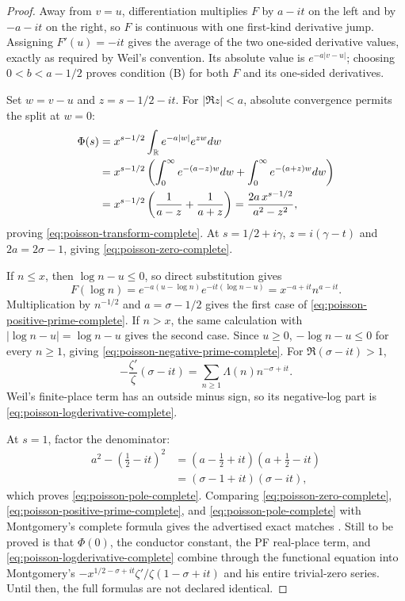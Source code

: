\begin{proof}
Away from $v=u$, differentiation multiplies $F$ by $a-it$ on the left and by
$-a-it$ on the right, so $F$ is continuous with one first-kind derivative
jump.  Assigning $F'(u)=-it$ gives the average of the two one-sided derivative
values, exactly as required by Weil's convention.  Its absolute value is
$e^{-a|v-u|}$; choosing
$0<b<a-1/2$ proves condition (B) for both $F$ and its one-sided derivatives.

Set $w=v-u$ and $z=s-1/2-it$.  For $|\Re z|<a$, absolute convergence permits
the split at $w=0$:
\begin{align*}
 \Phi(s)
 &=x^{s-1/2}\int_\mathbb R e^{-a|w|}e^{zw}dw\\
 &=x^{s-1/2}
 \left(\int_0^\infty e^{-(a-z)w}dw
       +\int_0^\infty e^{-(a+z)w}dw\right)\\
 &=x^{s-1/2}\left(\frac1{a-z}+\frac1{a+z}\right)
 =\frac{2a\,x^{s-1/2}}{a^2-z^2},
\end{align*}
proving \eqref{eq:poisson-transform-complete}.  At
$s=1/2+i\gamma$, $z=i(\gamma-t)$ and $2a=2\sigma-1$, giving
\eqref{eq:poisson-zero-complete}.

If $n\leq x$, then $\log n-u\leq0$, so direct substitution gives
\[
 F(\log n)=e^{-a(u-\log n)}e^{-it(\log n-u)}
 =x^{-a+it}n^{a-it}.
\]
Multiplication by $n^{-1/2}$ and $a=\sigma-1/2$ gives the first case of
\eqref{eq:poisson-positive-prime-complete}.  If $n>x$, the same calculation
with $|\log n-u|=\log n-u$ gives the second case.  Since $u\geq0$,
$-\log n-u\leq0$ for every $n\geq1$, giving
\eqref{eq:poisson-negative-prime-complete}.  For $\Re(\sigma-it)>1$,
\[
 -\frac{\zeta'}{\zeta}(\sigma-it)
 =\sum_{n\geq1}\Lambda(n)n^{-\sigma+it}.
\]
Weil's finite-place term has an outside minus sign, so its negative-log part
is \eqref{eq:poisson-logderivative-complete}.

At $s=1$, factor the denominator:
\begin{align*}
 a^2-(\tfrac12-it)^2
 &=(a-\tfrac12+it)(a+\tfrac12-it)\\
 &=(\sigma-1+it)(\sigma-it),
\end{align*}
which proves \eqref{eq:poisson-pole-complete}.  Comparing
\eqref{eq:poisson-zero-complete},
\eqref{eq:poisson-positive-prime-complete}, and
\eqref{eq:poisson-pole-complete} with Montgomery's complete formula gives
the advertised exact matches
\cite[pp.~185--187, eqs.~(18)--(22)]{montgomery1973}.  Still to be proved is
that $\Phi(0)$, the conductor constant, the PF real-place term, and
\eqref{eq:poisson-logderivative-complete} combine through the functional
equation into Montgomery's $-x^{1/2-\sigma+it}\zeta'/\zeta(1-\sigma+it)$ and
his entire trivial-zero series.  Until then, the full formulas are not
declared identical.
\end{proof}
